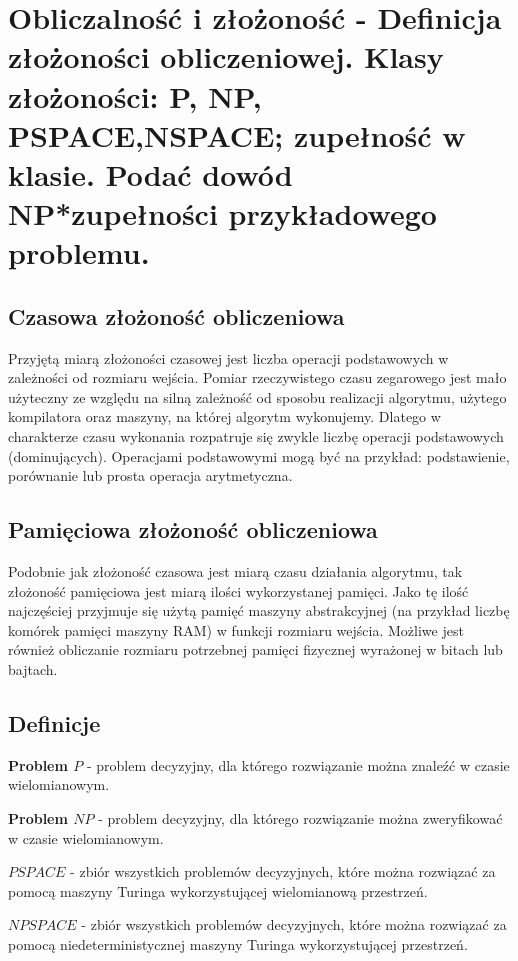 \section{Obliczalność i złożoność - Definicja złożoności obliczeniowej.
Klasy złożoności: P, NP, PSPACE,NSPACE; zupełność w klasie.
Podać dowód NP*zupełności przykładowego problemu.}

\subsection{Czasowa złożoność obliczeniowa}
Przyjętą miarą złożoności czasowej jest liczba operacji podstawowych w zależności od rozmiaru wejścia.
Pomiar rzeczywistego czasu zegarowego jest mało użyteczny ze względu na silną zależność od sposobu realizacji algorytmu,
użytego kompilatora oraz maszyny, na której algorytm wykonujemy.
Dlatego w charakterze czasu wykonania rozpatruje się zwykle liczbę operacji podstawowych (dominujących).
Operacjami podstawowymi mogą być na przykład: podstawienie, porównanie lub prosta operacja arytmetyczna.

\subsection{Pamięciowa złożoność obliczeniowa}
Podobnie jak złożoność czasowa jest miarą czasu działania algorytmu,
tak złożoność pamięciowa jest miarą ilości wykorzystanej pamięci.
Jako tę ilość najczęściej przyjmuje się użytą pamięć maszyny abstrakcyjnej
(na przykład liczbę komórek pamięci maszyny RAM) w funkcji rozmiaru wejścia.
Możliwe jest również obliczanie rozmiaru potrzebnej pamięci fizycznej wyrażonej w bitach lub bajtach.

\subsection{Definicje}

\textbf{Problem $P$} - problem decyzyjny, dla którego rozwiązanie można znaleźć w czasie wielomianowym.

\textbf{Problem $NP$} - problem decyzyjny, dla którego rozwiązanie można zweryfikować w czasie wielomianowym.

\textbf{$PSPACE$} - zbiór wszystkich problemów decyzyjnych,
które można rozwiązać za pomocą maszyny Turinga wykorzystującej wielomianową przestrzeń.

\textbf{$NPSPACE$} - zbiór wszystkich problemów decyzyjnych,
które można rozwiązać za pomocą niedeterministycznej maszyny Turinga wykorzystującej przestrzeń.

